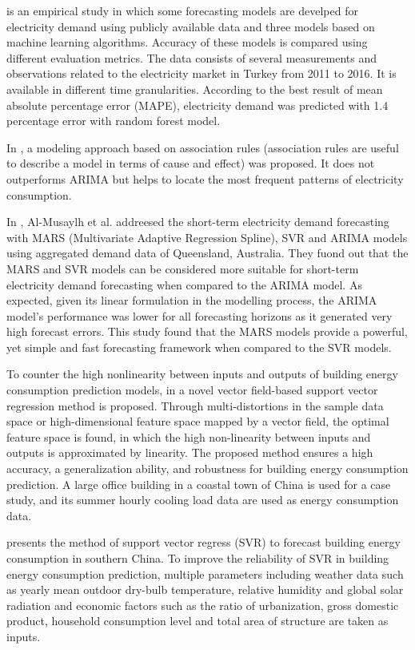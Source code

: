 \cite{8093428} is an empirical study in which some forecasting models are develped for electricity demand using publicly available data and three models based on machine learning algorithms.
Accuracy of these models is compared using different evaluation metrics.
The data consists of several measurements and observations related to the electricity market in Turkey from 2011 to 2016.
It is available in different time granularities.
According to the best result of mean absolute percentage error (MAPE), electricity demand was predicted with 1.4 percentage error with random forest model. 

In \cite{9046493}, a modeling approach based on association rules (association rules are useful to describe a model in terms of cause and effect) was proposed.
It does not outperforms ARIMA but helps to locate the most frequent patterns of electricity consumption.

In \cite{ALMUSAYLH20181}, Al-Musaylh et al. addreesed the short-term electricity demand forecasting with MARS (Multivariate Adaptive Regression Spline), SVR and ARIMA models using aggregated demand data of Queensland, Australia.
They fuond out that the MARS and SVR models can be considered more suitable for short-term electricity demand forecasting when compared to the ARIMA model.
As expected, given its linear formulation in the modelling process, the ARIMA model’s performance was lower for all forecasting horizons as it generated very high forecast errors.
This study found that the MARS models provide a powerful, yet simple and fast forecasting framework when compared to the SVR models.

To counter the high nonlinearity between inputs and outputs of building energy consumption prediction models, in \cite{ZHONG2019403} a novel vector field-based support vector regression method is proposed.
Through multi-distortions in the sample data space or high-dimensional feature space mapped by a vector field, the optimal feature space is found, in which the high non-linearity between inputs and outputs is approximated by linearity. 
The proposed method ensures a high accuracy, a generalization ability, and robustness for building energy consumption prediction.
A large office building in a coastal town of China is used for a case study, and its summer hourly cooling load data are used as energy consumption data.

\cite{MA20193433} presents the method of support vector regress (SVR) to forecast building energy consumption in southern China.
To improve the reliability of SVR in building energy consumption prediction, multiple parameters including weather data such as yearly mean outdoor dry-bulb temperature, relative humidity and global solar radiation and economic factors such as the ratio of urbanization, gross domestic product, household consumption level and total area of structure are taken as inputs.

